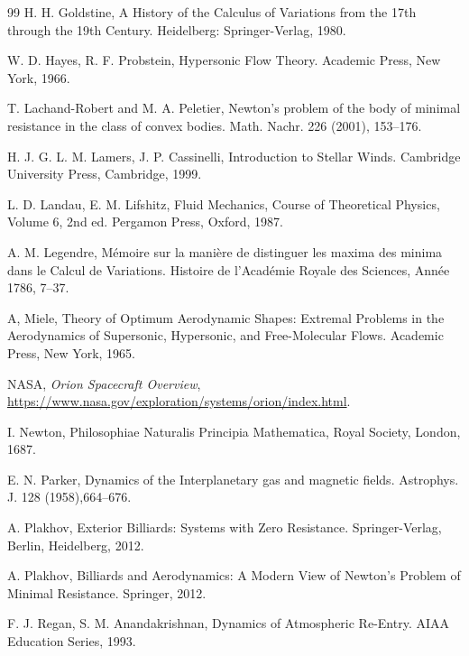 \documentclass[a4paper,12pt]{amsart}
\theoremstyle{plain}
\theoremstyle{definition}
\begin{document}
\begin{thebibliography}{99}
  H. H. Goldstine, A History of the Calculus of Variations from the 17th through the 19th Century. Heidelberg: Springer-Verlag, 1980.

 W. D. Hayes, R. F.  Probstein,  Hypersonic Flow Theory. Academic Press, New York, 1966.

T. Lachand-Robert and M. A. Peletier, Newton's problem of the body of minimal resistance in the class of convex bodies. Math. Nachr. 226 (2001), 153--176.

H. J. G. L. M. Lamers, J. P. Cassinelli,
Introduction to Stellar Winds. Cambridge University Press, Cambridge, 1999.

L. D. Landau, E. M. Lifshitz, Fluid Mechanics, Course of Theoretical Physics, Volume 6, 2nd ed.
Pergamon Press, Oxford, 1987.
 



 A. M. Legendre, M\'emoire sur la mani\`ere de distinguer les maxima des minima dans le Calcul de Variations. Histoire de l'Acad\'emie Royale des Sciences, Ann\'ee 1786, 7--37. 

 A, Miele,      Theory of Optimum Aerodynamic Shapes: Extremal Problems in the Aerodynamics of Supersonic, Hypersonic, and Free-Molecular Flows. Academic Press, New York, 1965. 

NASA, \textit{Orion Spacecraft Overview}, 
\url{https://www.nasa.gov/exploration/systems/orion/index.html}.

  I. Newton, Philosophiae Naturalis Principia Mathematica, Royal Society, London, 1687.


E. N. Parker, Dynamics of the Interplanetary gas and magnetic fields. Astrophys. J. 128 (1958),664--676. 


A. Plakhov, Exterior Billiards: Systems with Zero Resistance. Springer-Verlag, Berlin, Heidelberg, 2012.


A. Plakhov, Billiards and Aerodynamics: A Modern View of Newton's Problem of Minimal Resistance. Springer, 2012.


 F. J. Regan, S. M. Anandakrishnan, Dynamics of Atmospheric Re-Entry.  
AIAA Education Series, 1993.


\end{thebibliography}
\end{document}
